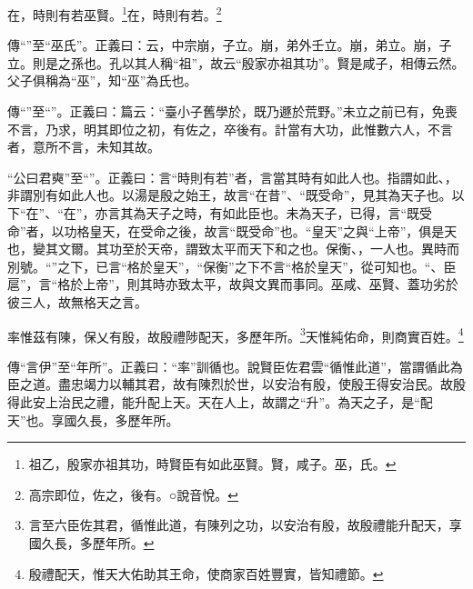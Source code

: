 在，時則有若巫賢。\footnote{祖乙，殷家亦祖其功，時賢臣有如此巫賢。賢，咸子。巫，氏。}在，時則有若。\footnote{高宗即位，佐之，後有。○說音悅。}

{\noindent\zhuan{}\fzbyks 傳“”至“巫氏”。正義曰：云，中宗崩，子立。崩，弟外壬立。崩，弟立。崩，子立。則是之孫也。孔以其人稱“祖”，故云“殷家亦祖其功”。賢是咸子，相傳云然。父子俱稱為“巫”，知“巫”為氏也。 \par}

{\noindent\zhuan{}\fzbyks 傳“”至“”。正義曰：篇云：“臺小子舊學於，既乃遯於荒野。”未立之前已有，免喪不言，乃求，明其即位之初，有佐之，卒後有。計當有大功，此惟數六人，不言者，意所不言，未知其故。 \par}

{\noindent\shu{}\fzkt “公曰君奭”至“”。正義曰：言“時則有若”者，言當其時有如此人也。指謂如此、，非謂別有如此人也。以湯是殷之始王，故言“在昔”、“既受命”，見其為天子也。以下“在”、“在”，亦言其為天子之時，有如此臣也。未為天子，已得，言“既受命”者，以功格皇天，在受命之後，故言“既受命”也。“皇天”之與“上帝”，俱是天也，變其文爾。其功至於天帝，謂致太平而天下和之也。保衡、，一人也。異時而別號。“”之下，已言“格於皇天”，“保衡”之下不言“格於皇天”，從可知也。“、臣扈”，言“格於上帝”，則其時亦致太平，故與文異而事同。巫咸、巫賢、蓋功劣於彼三人，故無格天之言。 \par}

率惟茲有陳，保乂有殷，故殷禮陟配天，多歷年所。\footnote{言至六臣佐其君，循惟此道，有陳列之功，以安治有殷，故殷禮能升配天，享國久長，多歷年所。}天惟純佑命，則商實百姓。\footnote{殷禮配天，惟天大佑助其王命，使商家百姓豐實，皆知禮節。}


{\noindent\zhuan{}\fzbyks 傳“言伊”至“年所”。正義曰：“率”訓循也。說賢臣佐君雲“循惟此道”，當謂循此為臣之道。盡忠竭力以輔其君，故有陳烈於世，以安治有殷，使殷王得安治民。故殷得此安上治民之禮，能升配上天。天在人上，故謂之“升”。為天之子，是“配天”也。享國久長，多歷年所。 \par}

